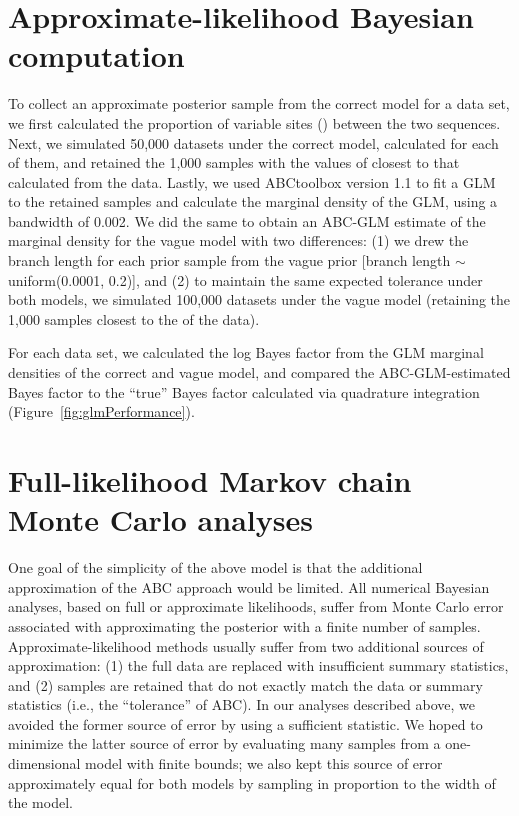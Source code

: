 \section{Approximate-likelihood Bayesian computation}
To collect an approximate posterior sample from the correct model for a data
set, we first calculated the proportion of variable sites (\pvar) between the
two sequences.
Next, we simulated 50,000 datasets under the correct model, calculated \pvar
for each of them, and retained the 1,000 samples with the values of \pvar
closest to that calculated from the data.
Lastly, we used ABCtoolbox version 1.1 \cite{ABCtoolbox} to fit a GLM to the
retained samples and calculate the marginal density of the GLM, using a
bandwidth of 0.002.
We did the same to obtain an ABC-GLM estimate of the marginal density
for the vague model with two differences:
(1) we drew the branch length for each prior sample from the vague prior
[branch length $\sim$ uniform(0.0001, 0.2)], and
(2) to maintain the same expected tolerance under both models, we simulated
100,000 datasets under the vague model (retaining the 1,000 samples closest to
the \pvar of the data).

For each data set, we calculated the log Bayes factor from the GLM marginal
densities of the correct and vague model, and compared the ABC-GLM-estimated
Bayes factor to the ``true'' Bayes factor calculated via quadrature
integration (Figure~\ref{fig:glmPerformance}).

\section{Full-likelihood Markov chain Monte Carlo analyses}
One goal of the simplicity of the above model is that the additional
approximation of the ABC approach would be limited.
All numerical Bayesian analyses, based on full or approximate likelihoods,
suffer from Monte Carlo error associated with approximating the posterior with
a finite number of samples.
Approximate-likelihood methods usually suffer from two additional sources of
approximation:
(1) the full data are replaced with insufficient summary statistics, and
(2) samples are retained that do not exactly match the data or summary
statistics (i.e., the ``tolerance'' of ABC).
In our analyses described above, we avoided the former source of error by
using a sufficient statistic.
We hoped to minimize the latter source of error by evaluating many samples from
a one-dimensional model with finite bounds; we also kept this source of error
approximately equal for both models by sampling in proportion to the width of
the model.

